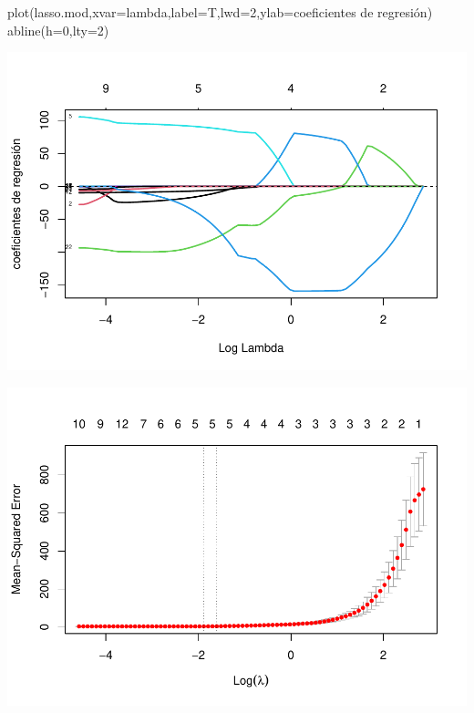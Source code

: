 \documentclass[
]{article}
\newenvironment{Shaded}{\begin{snugshade}}{\end{snugshade}}
\newcommand{\AttributeTok}[1]{\textcolor[rgb]{0.77,0.63,0.00}{#1}}
\newcommand{\DecValTok}[1]{\textcolor[rgb]{0.00,0.00,0.81}{#1}}
\newcommand{\FunctionTok}[1]{\textcolor[rgb]{0.00,0.00,0.00}{#1}}
\newcommand{\NormalTok}[1]{#1}
\newcommand{\OtherTok}[1]{\textcolor[rgb]{0.56,0.35,0.01}{#1}}
\newcommand{\SpecialCharTok}[1]{\textcolor[rgb]{0.00,0.00,0.00}{#1}}
\newcommand{\StringTok}[1]{\textcolor[rgb]{0.31,0.60,0.02}{#1}}
\begin{document}
\begin{Shaded}
\begin{Highlighting}[]
\FunctionTok{plot}\NormalTok{(lasso.mod,}\AttributeTok{xvar=}\StringTok{\textquotesingle{}lambda\textquotesingle{}}\NormalTok{,}\AttributeTok{label=}\NormalTok{T,}\AttributeTok{lwd=}\DecValTok{2}\NormalTok{,}\AttributeTok{ylab=}\StringTok{\textquotesingle{}coeficientes de regresión\textquotesingle{}}\NormalTok{)}
\FunctionTok{abline}\NormalTok{(}\AttributeTok{h=}\DecValTok{0}\NormalTok{,}\AttributeTok{lty=}\DecValTok{2}\NormalTok{)}
\end{Highlighting}
\end{Shaded}

\includegraphics{Taller-2-Regresion-Multiple-Aplicada_files/figure-latex/unnamed-chunk-6-1.pdf}

\begin{Shaded}
\end{Shaded}

\includegraphics{Taller-2-Regresion-Multiple-Aplicada_files/figure-latex/unnamed-chunk-6-2.pdf}
\end{document}

